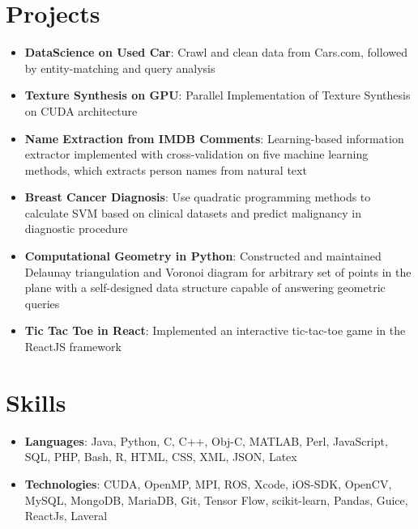 \documentclass[a4paper,11pt]{article}
\newcommand{\projectItem}[2]{
	\item\small{
    \textbf{#1}{: #2 \vspace{-6pt}}
  }
}
\newcommand{\skillItem}[2]{
	\item\small{
    \textbf{#1}{: #2 \vspace{-5pt}}
  }
}
\newcommand{\sectionStart}{\begin{itemize}[leftmargin=*]}
\newcommand{\sectionEnd}{\end{itemize}}
\begin{document}
\section{Projects}
	\sectionStart
		\projectItem{DataScience on Used Car}
		{Crawl and clean data from Cars.com, followed by entity-matching and query analysis}
		\projectItem{Texture Synthesis on GPU}
		{Parallel Implementation of Texture Synthesis on CUDA architecture}
		\projectItem{Name Extraction from IMDB Comments}
		{Learning-based information extractor implemented with cross-validation on five machine learning methods, which extracts person names from natural text}
		\projectItem{Breast Cancer Diagnosis}
		{Use quadratic programming methods to calculate SVM based on clinical datasets and predict malignancy in diagnostic procedure}
		\projectItem{Computational Geometry in Python}
		{Constructed and maintained Delaunay triangulation and Voronoi diagram for arbitrary set of points in the plane with a self-designed data structure capable of answering geometric queries}
		\projectItem{Tic Tac Toe in React}
		{Implemented an interactive tic-tac-toe game in the ReactJS framework}
	\sectionEnd

\section{Skills}
	\sectionStart
		\skillItem{Languages}
		{Java, Python, C, C++, Obj-C, MATLAB, Perl, JavaScript, SQL, PHP, Bash, R, HTML, CSS, XML, JSON, Latex}
		\skillItem{Technologies}
		{CUDA, OpenMP, MPI, ROS, Xcode, iOS-SDK, OpenCV, MySQL, MongoDB, MariaDB, Git, Tensor Flow, scikit-learn, Pandas, Guice, ReactJs, Laveral}
	\sectionEnd
\end{document}
